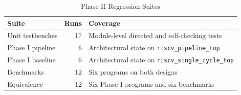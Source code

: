 \begin{table}[!t]
\centering
\caption{Phase II Regression Suites}
\label{tab:phase2-tests}
\begin{tabular}{@{}lrl@{}}
\toprule
\textbf{Suite} & \textbf{Runs} & \textbf{Coverage} \\
\midrule
Unit testbenches & 17 & Module-level directed and self-checking tests \\
Phase I pipeline & 6 & Architectural state on \texttt{riscv\_pipeline\_top} \\
Phase I baseline & 6 & Architectural state on \texttt{riscv\_single\_cycle\_top} \\
Benchmarks & 12 & Six programs on both designs \\
Equivalence & 12 & Six Phase I programs and six benchmarks \\
\bottomrule
\end{tabular}
\end{table}
